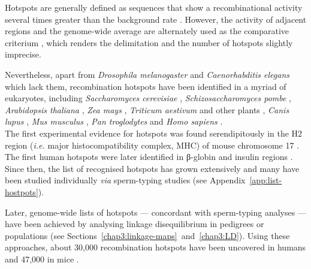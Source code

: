 Hotspots are generally defined as sequences that show a recombinational activity several times greater than the background rate \citep{crawford2004evidence,stapley2017variation}. 
However, the activity of adjacent regions and the genome-wide average are alternately used as the comparative criterium \citep{demassy2013initiation}, which renders the delimitation and the number of hotspots slightly imprecise.

Nevertheless, apart from \textit{Drosophila melanogaster} \citep{comeron2012many,manzano-winkler2013how} and \textit{Caenorhabditis elegans} \citep{kaur2014crossover} which lack them, recombination hotspots have been identified in a myriad of eukaryotes, including \textit{Saccharomyces cerevisiae} \citep{sun1989doublestrand,lichten1995meiotic}, \textit{Schizosaccharomyces pombe} \citep{steiner2005natural,cromie2007discrete}, \textit{Arabidopsis thaliana} \citep{drouaud2006variation}, \textit{Zea mays} \citep{dooner1997recombination,yao2002molecular}, \textit{Triticum aestivum} \citep{saintenac2011variation} and other plants \citep{mezard2006meiotic}, \textit{Canis lupus} \citep{axelsson2012death}, \textit{Mus musculus} \citep{paigen2010mammalian,smagulova2011genomewide}, \textit{Pan troglodytes} \citep{winckler2005comparison,auton2012finescale} and \textit{Homo sapiens} \citep{jeffreys2001intensely,myers2005finescale}.\\



The first experimental evidence for hotspots was found serendipitously in the H2 region (\textit{i.e.} major histocompatibility complex, MHC) of mouse chromosome 17 \citep{steinmetz1982molecular}.
The first human hotspots were later identified in \textgreek{β}-globin and insulin regions \citep{chakravarti1984nonuniform,chakravarti1986evidence}. 
Since then, the list of recognised hotspots has grown extensively \citep[reviewed in][]{arnheim2007mammalian,paigen2010mammalian} and many have been studied individually \textit{via} sperm-typing studies \citep[e.g.\ ][]{hubert1994high,jeffreys2001intensely,schneider2002direct} (see Appendix~\ref{app:list-hostpots}).

Later, genome-wide lists of hotspots — concordant with sperm-typing analyses \citep[e.g.][]{tiemann-boege2006highresolution} — have been achieved by analysing linkage disequilibrium in pedigrees or populations (see Sections~\ref{chap3:linkage-maps}~and~\ref{chap3:LD}).
Using these approaches, about 30,000 recombination hotspots have been uncovered in humans \citep{myers2005finescale,theinternationalhapmapconsortium2007seconda} and 47,000 in mice \citep{brunschwig2012finescale}.\\


